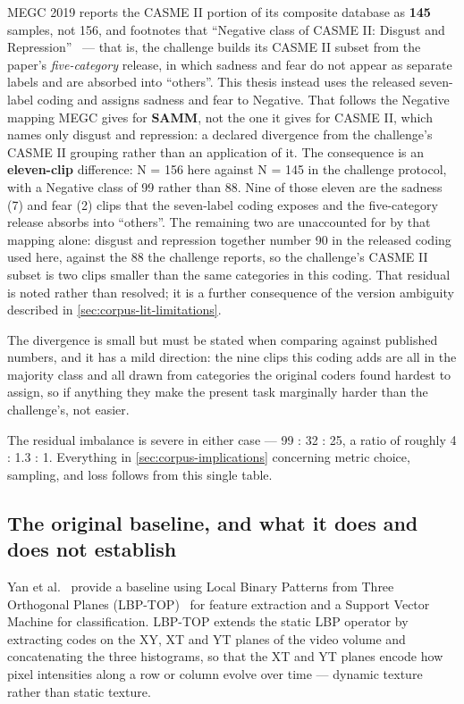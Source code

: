 MEGC 2019 reports the CASME II portion of its composite database as \textbf{145} samples, not 156, and footnotes that ``Negative class of CASME II: Disgust and Repression''~\cite{see2019} --- that is, the challenge builds its CASME II subset from the paper's \textit{five-category} release, in which sadness and fear do not appear as separate labels and are absorbed into ``others''. This thesis instead uses the released seven-label coding and assigns sadness and fear to Negative. That follows the Negative mapping MEGC gives for \textbf{SAMM}, not the one it gives for CASME II, which names only disgust and repression: a declared divergence from the challenge's CASME II grouping rather than an application of it. The consequence is an \textbf{eleven-clip} difference: N = 156 here against N = 145 in the challenge protocol, with a Negative class of 99 rather than 88. Nine of those eleven are the sadness (7) and fear (2) clips that the seven-label coding exposes and the five-category release absorbs into ``others''. The remaining two are unaccounted for by that mapping alone: disgust and repression together number 90 in the released coding used here, against the 88 the challenge reports, so the challenge's CASME II subset is two clips smaller than the same categories in this coding. That residual is noted rather than resolved; it is a further consequence of the version ambiguity described in \autoref{sec:corpus-lit-limitations}.

The divergence is small but must be stated when comparing against published numbers, and it has a mild direction: the nine clips this coding adds are all in the majority class and all drawn from categories the original coders found hardest to assign, so if anything they make the present task marginally harder than the challenge's, not easier.

The residual imbalance is severe in either case --- 99 : 32 : 25, a ratio of roughly 4 : 1.3 : 1. Everything in \autoref{sec:corpus-implications} concerning metric choice, sampling, and loss follows from this single table.


\subsection{The original baseline, and what it does and does not establish}
\label{sec:original-baseline}

Yan et al.~\cite{yan2014} provide a baseline using Local Binary Patterns from Three Orthogonal Planes (LBP-TOP)~\cite{zhaoG2007} for feature extraction and a Support Vector Machine for classification. LBP-TOP extends the static LBP operator by extracting codes on the XY, XT and YT planes of the video volume and concatenating the three histograms, so that the XT and YT planes encode how pixel intensities along a row or column evolve over time --- dynamic texture rather than static texture.

